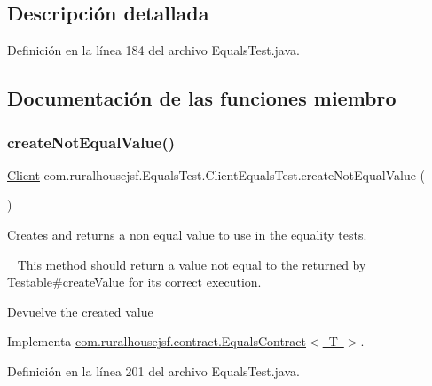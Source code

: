 \subsection{Descripción detallada}


Definición en la línea 184 del archivo Equals\+Test.\+java.



\subsection{Documentación de las funciones miembro}
\mbox{\label{classcom_1_1ruralhousejsf_1_1_equals_test_1_1_client_equals_test_a25218bb97f8e3d88b9dd7e13afd0a6ed}} 
\subsubsection{\texorpdfstring{createNotEqualValue()}{createNotEqualValue()}}
{\footnotesize\ttfamily \mbox{\hyperlink{classcom_1_1ruralhousejsf_1_1domain_1_1_client}{Client}} com.\+ruralhousejsf.\+Equals\+Test.\+Client\+Equals\+Test.\+create\+Not\+Equal\+Value (\begin{DoxyParamCaption}{ }\end{DoxyParamCaption})}



Creates and returns a non equal value to use in the equality tests. 

~\newline
 This method should return a value not equal to the returned by \mbox{\hyperlink{}{Testable\#create\+Value}} for its correct execution.

\begin{DoxyReturn}{Devuelve}
the created value 
\end{DoxyReturn}


Implementa \mbox{\hyperlink{interfacecom_1_1ruralhousejsf_1_1contract_1_1_equals_contract_a65840509b57f6b89e42e2abf1978aa01}{com.\+ruralhousejsf.\+contract.\+Equals\+Contract$<$ T $>$}}.



Definición en la línea 201 del archivo Equals\+Test.\+java.

